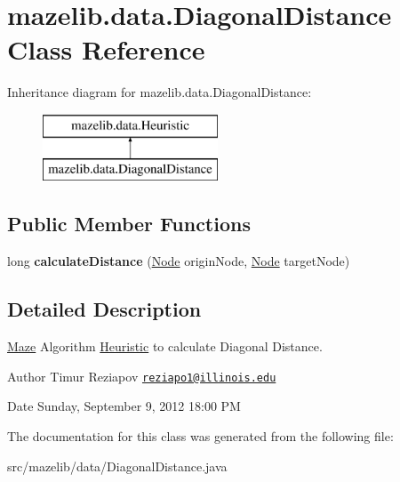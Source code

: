 \hypertarget{classmazelib_1_1data_1_1_diagonal_distance}{\section{mazelib.\-data.\-Diagonal\-Distance Class Reference}
\label{classmazelib_1_1data_1_1_diagonal_distance}
}
Inheritance diagram for mazelib.\-data.\-Diagonal\-Distance\-:\begin{figure}[H]
\begin{center}
\leavevmode
\includegraphics[height=2.000000cm]{classmazelib_1_1data_1_1_diagonal_distance}
\end{center}
\end{figure}
\subsection*{Public Member Functions}
\begin{DoxyCompactItemize}
\item 
\hypertarget{classmazelib_1_1data_1_1_diagonal_distance_a5d0d1ab0b905edd45bbec8f4ad82f371}{long {\bfseries calculate\-Distance} (\hyperlink{classmazelib_1_1data_1_1_node}{Node} origin\-Node, \hyperlink{classmazelib_1_1data_1_1_node}{Node} target\-Node)}\label{classmazelib_1_1data_1_1_diagonal_distance_a5d0d1ab0b905edd45bbec8f4ad82f371}

\end{DoxyCompactItemize}


\subsection{Detailed Description}
\hyperlink{classmazelib_1_1data_1_1_maze}{Maze} Algorithm \hyperlink{interfacemazelib_1_1data_1_1_heuristic}{Heuristic} to calculate Diagonal Distance. \begin{DoxyAuthor}{Author}
Timur Reziapov \href{mailto:reziapo1@illinois.edu}{\tt reziapo1@illinois.\-edu} 
\end{DoxyAuthor}
\begin{DoxyDate}{Date}
Sunday, September 9, 2012 18\-:00 P\-M 
\end{DoxyDate}


The documentation for this class was generated from the following file\-:\begin{DoxyCompactItemize}
\item 
src/mazelib/data/Diagonal\-Distance.\-java\end{DoxyCompactItemize}
